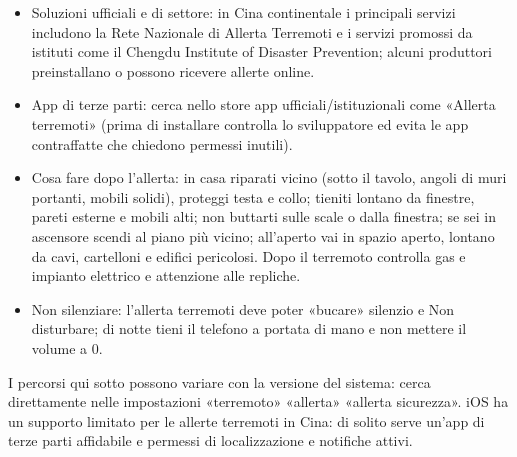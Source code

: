 \begin{itemize}
  \item Soluzioni ufficiali e di settore: in Cina continentale i principali servizi includono la Rete Nazionale di Allerta Terremoti e i servizi promossi da istituti come il Chengdu Institute of Disaster Prevention; alcuni produttori preinstallano o possono ricevere allerte online.
  \item App di terze parti: cerca nello store app ufficiali/istituzionali come «Allerta terremoti» (prima di installare controlla lo sviluppatore ed evita le app contraffatte che chiedono permessi inutili).
  \item Cosa fare dopo l'allerta: in casa riparati vicino (sotto il tavolo, angoli di muri portanti, mobili solidi), proteggi testa e collo; tieniti lontano da finestre, pareti esterne e mobili alti; non buttarti sulle scale o dalla finestra; se sei in ascensore scendi al piano più vicino; all'aperto vai in spazio aperto, lontano da cavi, cartelloni e edifici pericolosi. Dopo il terremoto controlla gas e impianto elettrico e attenzione alle repliche.
  \item Non silenziare: l'allerta terremoti deve poter «bucare» silenzio e Non disturbare; di notte tieni il telefono a portata di mano e non mettere il volume a 0.
\end{itemize}


I percorsi qui sotto possono variare con la versione del sistema: cerca direttamente nelle impostazioni «terremoto» «allerta» «allerta sicurezza». iOS ha un supporto limitato per le allerte terremoti in Cina: di solito serve un'app di terze parti affidabile e permessi di localizzazione e notifiche attivi.

